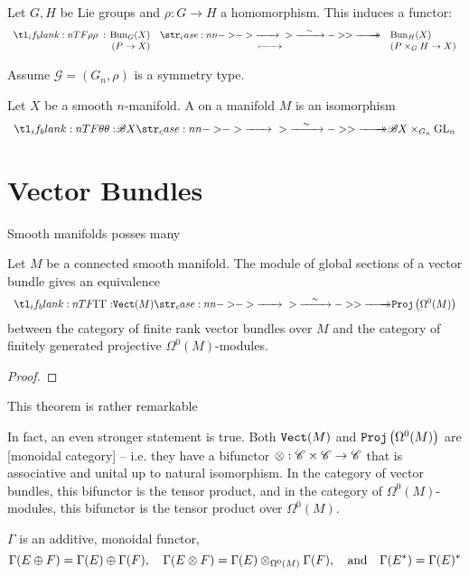 Let $G, H$ be Lie groups and $\rho : G \to H$ a homomorphism. This induces a functor:
\[
    \lkxfunc{\rho}{\Bun_G(X)}{\Bun_H(X)}{(P \to X)}{(P\times_G H \to X)}
\]

  Assume $\mathcal{G} = (G_n, \rho)$ is a symmetry type.

\begin{definition}
  Let $X$ be a smooth $n$-manifold.
  A  on a manifold $M$ is an isomorphism
  \[
    \lkxfunc{\theta}{\B X}{\B X\times_{G_n} \GL_n}
  \]
\end{definition}

\section{Vector Bundles}

Smooth manifolds posses many 

\begin{theorem}\label{eq:serre_swan}
Let $M$ be a connected smooth manifold.
  The module of global sections of a vector bundle gives an equivalence
  \[
    \lkxfunc{\Gamma}{\Vect(M)}{\Proj\left(\Omega^0(M)\right)}
  \]
  between the category of finite rank vector bundles over $M$ and the category of finitely generated projective $\Omega^0(M)$-modules.
\end{theorem}
\begin{proof}
\end{proof}

\begin{remark} 
  This theorem is rather remarkable 
\end{remark}

In fact, an even stronger statement is true. Both $\mathtt{Vect}(M)$ and $\mathtt{Proj}\left(\Omega^0(M)\right)$ are [monoidal category] -- i.e. they have a bifunctor $\otimes : \mathscr{C}\times \mathscr{C} \to \mathscr{C}$ that is associative and unital up to natural isomorphism. In the category of vector bundles, this bifunctor is the tensor product, and in the category of $\Omega^0(M)$-modules, this bifunctor is the tensor product over $\Omega^0(M)$. 

\begin{theorem} $\Gamma$ is an additive, monoidal functor, 
  \[
    \Gamma(E\oplus F) = \Gamma(E)\oplus\Gamma(F),\quad
    \Gamma(E\otimes F) = \Gamma(E)\otimes_{\Omega^0(M)}\Gamma(F),\quad\textrm{and}\quad
    \Gamma(E^*) = \Gamma(E)^*
  \]
\end{theorem}


